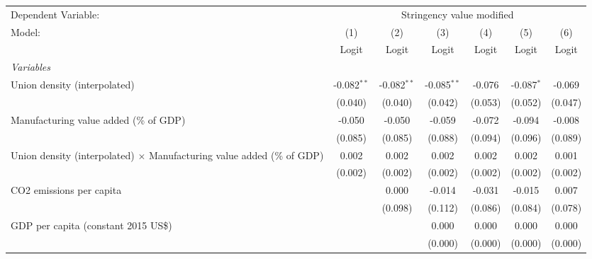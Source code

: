 
\begingroup
\centering
\begin{tabular}{lcccccc}
   \toprule
   Dependent Variable: & \multicolumn{6}{c}{Stringency value modified}\\
   Model:                                                                        & (1)           & (2)           & (3)           & (4)     & (5)          & (6)\\  
                                                                                 &  Logit        & Logit         & Logit         & Logit   & Logit        & Logit\\  
   \midrule
   \emph{Variables}\\
   Union density (interpolated)                                                  & -0.082$^{**}$ & -0.082$^{**}$ & -0.085$^{**}$ & -0.076  & -0.087$^{*}$ & -0.069\\   
                                                                                 & (0.040)       & (0.040)       & (0.042)       & (0.053) & (0.052)      & (0.047)\\   
   Manufacturing value added (\% of GDP)                                         & -0.050        & -0.050        & -0.059        & -0.072  & -0.094       & -0.008\\   
                                                                                 & (0.085)       & (0.085)       & (0.088)       & (0.094) & (0.096)      & (0.089)\\   
   Union density (interpolated) $\times$ Manufacturing value added (\% of GDP)   & 0.002         & 0.002         & 0.002         & 0.002   & 0.002        & 0.001\\   
                                                                                 & (0.002)       & (0.002)       & (0.002)       & (0.002) & (0.002)      & (0.002)\\   
   CO2 emissions per capita                                                      &               & 0.000         & -0.014        & -0.031  & -0.015       & 0.007\\   
                                                                                 &               & (0.098)       & (0.112)       & (0.086) & (0.084)      & (0.078)\\   
   GDP per capita (constant 2015 US\$)                                           &               &               & 0.000         & 0.000   & 0.000        & 0.000\\   
                                                                                 &               &               & (0.000)       & (0.000) & (0.000)      & (0.000)\\   

\end{tabular}
